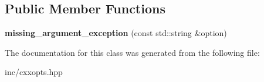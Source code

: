\subsection*{Public Member Functions}
\begin{DoxyCompactItemize}
\item 
{\bfseries missing\+\_\+argument\+\_\+exception} (const std\+::string \&option)\hypertarget{classcxxopts_1_1missing__argument__exception_a394d6f889c4bd90dd554ebd4d8cd50a2}{}\label{classcxxopts_1_1missing__argument__exception_a394d6f889c4bd90dd554ebd4d8cd50a2}

\end{DoxyCompactItemize}


The documentation for this class was generated from the following file\+:\begin{DoxyCompactItemize}
\item 
inc/cxxopts.\+hpp\end{DoxyCompactItemize}

